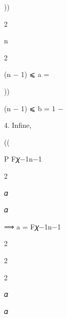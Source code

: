\documentclass[a4paper,portrait,12pt]{article}
\begin{document}
))





2


\begin{flushleft}
n
\end{flushleft}


2





\begin{flushleft}
(n $-$ 1) ⩽ a =
\end{flushleft}





))





\begin{flushleft}
(n $-$ 1) ⩽ b = 1 $-$
\end{flushleft}





\begin{flushleft}
4. Infine,
\end{flushleft}





((





\begin{flushleft}
P F𝜒$-$1n$-$1
\end{flushleft}


2





\begin{flushleft}
𝛼
\end{flushleft}


\begin{flushleft}
𝛼
\end{flushleft}


\begin{flushleft}
⟹ a = F𝜒$-$1n$-$1
\end{flushleft}


2


2


2


\begin{flushleft}
𝛼
\end{flushleft}


\begin{flushleft}
𝛼
\end{flushleft}
\end{document}
